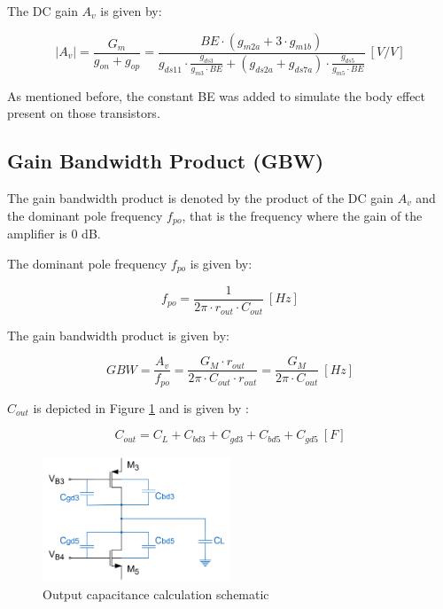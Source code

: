 The DC gain $A_v$ is given by:

\begin{equation}
    |A_v| = \frac{G_m}{g_{on} + g_{op}} = \frac{BE \cdot (g_{m2a} + 3 \cdot g_{m1b})}{g_{ds11} \cdot \frac{g_{ds3}}{g_{m3}\cdot BE} + (g_{ds2a} + g_{ds7a}) \cdot \frac{g_{ds5}}{g_{m5} \cdot BE}} \ [V/V]
    \label{eq:Av}
\end{equation}

As mentioned before, the constant BE was added to simulate the body effect present on those transistors.

\subsection{Gain Bandwidth Product (GBW)}
The gain bandwidth product is denoted by the product of the DC gain $A_v$ and the dominant pole frequency $f_{po}$, that is the frequency where the gain of the amplifier is 0 dB. 

The dominant pole frequency $f_{po}$ is given by:

\begin{equation}
    f_{po} = \frac{1}{2\pi \cdot r_{out} \cdot C_{out}} \ [Hz]
    \label{eq:fpo}
\end{equation}

The gain bandwidth product is given by:

\begin{equation}
    GBW = \frac{A_v}{f_{po}} = \frac{G_M \cdot r_{out}}{2\pi \cdot C_{out} \cdot r_{out}}=\frac{G_M}{2\pi \cdot C_{out}} \ [Hz]
    \label{eq:GBW}
\end{equation}

$C_{out}$ is depicted in Figure \ref{fig:cout_sch} and is given by :

\begin{equation}
    C_{out} = C_L + C_{bd3} + C_{gd3} + C_{bd5} + C_{gd5} \ [F]
    \label{eq:cout}
\end{equation}

\begin{figure}[H]
    \centering
    \includegraphics[width=0.5\textwidth]{Images/Cout_sch.png}
    \caption{Output capacitance calculation schematic}
    \label{fig:cout_sch}
\end{figure}

